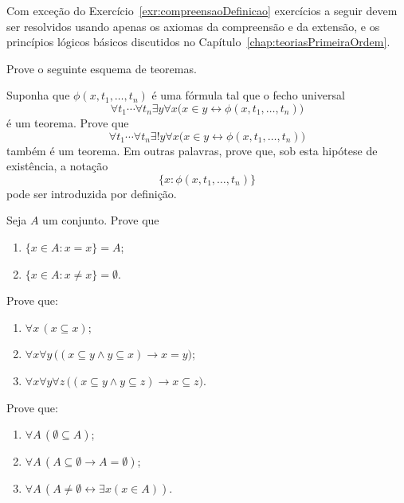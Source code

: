 Com exceção do Exercício~\ref{exr:compreensaoDefinicao} exercícios a seguir devem ser resolvidos usando apenas os axiomas da compreensão e da extensão, e os princípios lógicos básicos discutidos no Capítulo~\ref{chap:teoriasPrimeiraOrdem}.
\begin{exercise}
    Prove o seguinte esquema de teoremas.

    Suponha que $\phi(x,t_1,\ldots,t_n)$ é uma fórmula tal que o fecho universal
    \[
    \forall t_1\cdots\forall t_n
    \exists y\forall x
    \bigl(x\in y\leftrightarrow \phi(x,t_1,\ldots,t_n)\bigr)
    \]
    é um teorema. Prove que
    \[
    \forall t_1\cdots\forall t_n
    \exists!y\forall x
    \bigl(x\in y\leftrightarrow \phi(x,t_1,\ldots,t_n)\bigr)
    \]
    também é um teorema.
    Em outras palavras, prove que, sob esta hipótese de existência, a notação
    \[
    \{x:\phi(x,t_1,\ldots,t_n)\}
    \]
    pode ser introduzida por definição.
\end{exercise}

\begin{exercise}
    Seja $A$ um conjunto.
    Prove que
    \begin{enumerate}[label=(\alph*)]
        \item $\{x \in A : x = x\} = A$;
        \item $\{x \in A : x \neq x\} = \emptyset$.
    \end{enumerate}
\end{exercise}

\begin{exercise}
    Prove que:
    \begin{enumerate}[label=(\alph*)]
        \item $\forall x\, (x \subseteq x)$;
        \item $\forall x \forall y\, \bigl((x \subseteq y \land y \subseteq x) \rightarrow x = y\bigr)$;
        \item $\forall x \forall y \forall z\, \bigl((x \subseteq y \land y \subseteq z) \rightarrow x \subseteq z\bigr)$.
    \end{enumerate}
\end{exercise}

\begin{exercise}
Prove que:
\begin{enumerate}[label=(\alph*)]
    \item $\forall A\,(\emptyset\subseteq A)$;
    \item $\forall A\,(A\subseteq \emptyset \rightarrow A=\emptyset)$;
    \item $\forall A\,(A\neq\emptyset \leftrightarrow \exists x(x\in A))$.
\end{enumerate}
\end{exercise}

